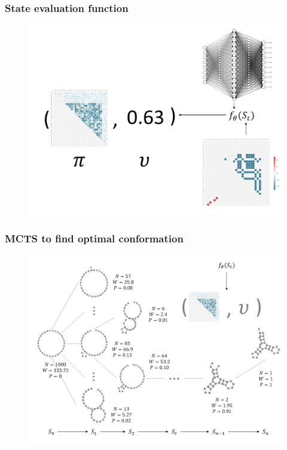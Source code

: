 \documentclass[notheorems, aspectratio=54]{beamer}
\begin{document}
\begin{frame}
    \frametitle{State evaluation function}

    \begin{figure}
        \includegraphics[height=0.9\textheight]{fig/rna_folding2.png}
    \end{figure}
\end{frame}

\begin{frame}
    \frametitle{MCTS to find optimal conformation}

    \begin{figure}
        \includegraphics[height=0.9\textheight]{fig/rna_folding3.png}
    \end{figure}
\end{frame}
\end{document}
